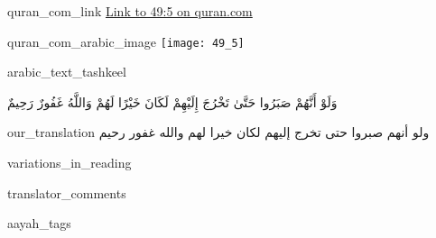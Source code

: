 \begin{comment}
The following strings are to be replaced by a script, in order to use this file as a template (all upper case):-
* sN = sūrah number, without leading zeros
* aYN = āyah number, without leading zeros
* aRABIC_TEXT_TASHKEEL = the text of the aayah, with tashkeel marks
* aRABIC_TEXT_WITHOUT_TASHKEEL = the text of the aayah, without tashkeel marks
* tAFSEER_SADI_ARABIC = the tafseer of the aayah from as-sa'di
\end{comment}
\begin{comment}
The following tags are declared here:-
quran_com_link
quran_com_arabic_image
arabic_text_tashkeel
our_translation
variations_in_reading
translator_comments
aayah_tags
tafseer_sadi_arabic
tafseer_sadi_translation
license_attribution_aayah
\end{comment}
\begin{taggedblock}{quran_com_link}
\href{http://quran.com/49/5}{Link to 49:5 on quran.com}
\end{taggedblock}
\begin{taggedblock}{quran_com_arabic_image}
\texttt{[image: 49\_5]}
\end{taggedblock}
\begin{taggedblock}{arabic_text_tashkeel}
\begin{Arabic}
وَلَوْ أَنَّهُمْ صَبَرُوا حَتَّىٰ تَخْرُجَ إِلَيْهِمْ لَكَانَ خَيْرًا لَهُمْ وَاللَّهُ غَفُورٌ رَحِيمٌ
\end{Arabic}
\end{taggedblock}
\begin{taggedblock}{our_translation}
ولو أنهم صبروا حتى تخرج إليهم لكان خيرا لهم والله غفور رحيم
\end{taggedblock}
\begin{taggedblock}{variations_in_reading}
\end{taggedblock}
\begin{taggedblock}{translator_comments}
\end{taggedblock}
\begin{taggedblock}{aayah_tags}
\end{taggedblock}
